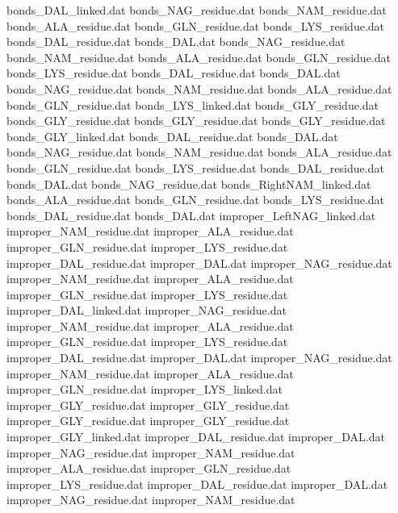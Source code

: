 bonds_DAL_linked.dat            
bonds_NAG_residue.dat           
bonds_NAM_residue.dat           
bonds_ALA_residue.dat           
bonds_GLN_residue.dat           
bonds_LYS_residue.dat           
bonds_DAL_residue.dat           
bonds_DAL.dat                   
bonds_NAG_residue.dat           
bonds_NAM_residue.dat           
bonds_ALA_residue.dat           
bonds_GLN_residue.dat           
bonds_LYS_residue.dat           
bonds_DAL_residue.dat           
bonds_DAL.dat                   
bonds_NAG_residue.dat           
bonds_NAM_residue.dat           
bonds_ALA_residue.dat           
bonds_GLN_residue.dat           
bonds_LYS_linked.dat            
bonds_GLY_residue.dat
bonds_GLY_residue.dat
bonds_GLY_residue.dat
bonds_GLY_residue.dat
bonds_GLY_linked.dat
bonds_DAL_residue.dat           
bonds_DAL.dat                   
bonds_NAG_residue.dat           
bonds_NAM_residue.dat           
bonds_ALA_residue.dat           
bonds_GLN_residue.dat           
bonds_LYS_residue.dat           
bonds_DAL_residue.dat           
bonds_DAL.dat                   
bonds_NAG_residue.dat           
bonds_RightNAM_linked.dat       
bonds_ALA_residue.dat           
bonds_GLN_residue.dat           
bonds_LYS_residue.dat           
bonds_DAL_residue.dat           
bonds_DAL.dat                   
improper_LeftNAG_linked.dat     
improper_NAM_residue.dat        
improper_ALA_residue.dat        
improper_GLN_residue.dat        
improper_LYS_residue.dat        
improper_DAL_residue.dat        
improper_DAL.dat                
improper_NAG_residue.dat        
improper_NAM_residue.dat        
improper_ALA_residue.dat        
improper_GLN_residue.dat        
improper_LYS_residue.dat        
improper_DAL_linked.dat         
improper_NAG_residue.dat        
improper_NAM_residue.dat        
improper_ALA_residue.dat        
improper_GLN_residue.dat        
improper_LYS_residue.dat        
improper_DAL_residue.dat        
improper_DAL.dat                
improper_NAG_residue.dat        
improper_NAM_residue.dat        
improper_ALA_residue.dat        
improper_GLN_residue.dat        
improper_LYS_linked.dat         
improper_GLY_residue.dat
improper_GLY_residue.dat
improper_GLY_residue.dat
improper_GLY_residue.dat
improper_GLY_linked.dat
improper_DAL_residue.dat        
improper_DAL.dat                
improper_NAG_residue.dat        
improper_NAM_residue.dat        
improper_ALA_residue.dat        
improper_GLN_residue.dat        
improper_LYS_residue.dat        
improper_DAL_residue.dat        
improper_DAL.dat                
improper_NAG_residue.dat        
improper_NAM_residue.dat        
